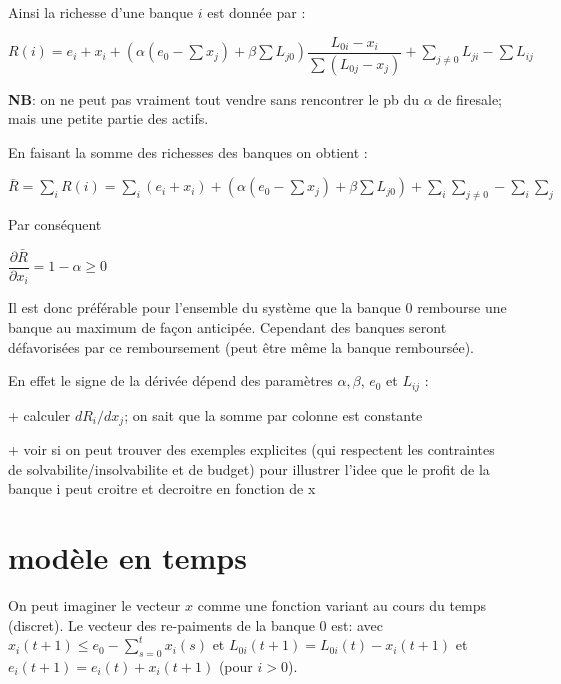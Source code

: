 \documentclass[11pt,oneside,twocolumn]{article}
\begin{document}
Ainsi la richesse d'une banque $i$ est donnée par :

$R(i)= e_i + x_i + (\alpha (e_0 - \sum x_j) + \beta \sum L_{j0}) \dfrac{L_{0i}- x_i}{\sum (L_{0j} - x_j)} + \sum_{j \neq 0} L_{ji} - \sum L_{ij}$

\textbf{NB}: on ne peut pas vraiment tout vendre sans rencontrer le pb du $\alpha$ de firesale; mais une petite partie des actifs.

En faisant la somme des richesses des banques on obtient :

$\bar R = \sum_i R(i) = \sum_i (e_i + x_i) +  (\alpha (e_0 - \sum x_j) + \beta \sum L_{j0}) + \sum_i \sum_{j \neq 0} - \sum_i \sum_j$
  
Par conséquent 

$\dfrac{\partial \bar R}{\partial x_i} = 1 - \alpha\geq0$

Il est donc préférable pour l'ensemble du système que la banque $0$ rembourse une banque au maximum de façon anticipée. Cependant des banques seront défavorisées par ce remboursement (peut être même la banque remboursée). 

En effet le signe de la dérivée dépend des paramètres $\alpha, \beta$, $e_0$ et $L_{ij}$ : 

+ calculer $dR_i/dx_j$; on sait que la somme par colonne est constante

+ voir si on peut trouver des exemples explicites (qui respectent les contraintes de solvabilite/insolvabilite
et de budget) pour illustrer l'idee que le profit de la banque i peut croitre et decroitre en fonction de x

\section{modèle en temps}
On peut imaginer le vecteur $x$ comme une fonction variant au cours du temps (discret). Le vecteur des re-paiments de la banque 0 est:
avec 
$x_i(t+1) \leq e_0 - \sum_{s=0}^{t}x_i(s)$ et $L_{0i}(t+1)=L_{0i}(t) - x_i(t+1)$ et
$e_i(t+1) = e_i(t) +x_i(t+1)$ (pour $i>0$).
\end{document}
